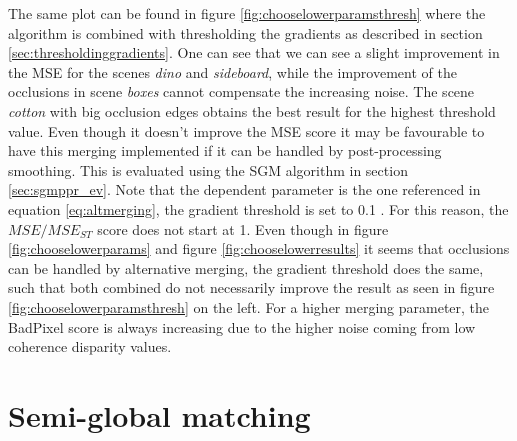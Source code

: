 \documentclass  [
  paper    = a4,
  BCOR     = 10mm,
  twoside,
  fontsize = 12pt,
  fleqn,
  toc      = bibnumbered,
  toc      = listofnumbered,
  numbers  = noendperiod,
  headings = normal,
  listof   = leveldown,
  version  = 3.03
]                                       {scrreprt}
\begin{document}
The same plot can be found in figure \ref{fig:chooselowerparamsthresh} where the algorithm is combined with thresholding the gradients as described in section \ref{sec:thresholdinggradients}. One can see that we can see a slight improvement in the MSE for the scenes \textit{dino} and \textit{sideboard}, while the improvement of the occlusions in scene \textit{boxes} cannot compensate the increasing noise. The scene \textit{cotton} with big occlusion edges obtains the best result for the highest threshold value. Even though it doesn't improve the MSE score it may be favourable to have this merging implemented if it can be handled by post-processing smoothing. This is evaluated using the SGM algorithm in section \ref{sec:sgmppr_ev}. Note that the dependent parameter is the one referenced in equation \ref{eq:altmerging}, the gradient threshold is set to 0.1 . For this reason, the $MSE/MSE_{ST}$ score does not start at 1. Even though in figure \ref{fig:chooselowerparams} and figure \ref{fig:chooselowerresults} it seems that occlusions can be handled by alternative merging, the gradient threshold does the same, such that both combined do not necessarily improve the result as seen in figure \ref{fig:chooselowerparamsthresh} on the left. For a higher merging parameter, the BadPixel score is always increasing due to the higher noise coming from low coherence disparity values.
\section{Semi-global matching}
\label{sec:sgm}
\end{document}

